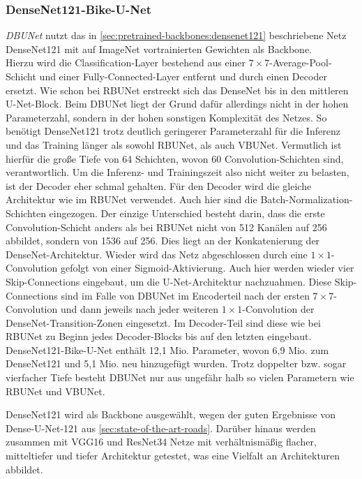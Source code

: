 \subsubsection{DenseNet121-Bike-U-Net}

\textit{\ac{DBUNet}} nutzt das in \autoref{sec:pretrained-backbones:densenet121} beschriebene Netz DenseNet121 
mit auf ImageNet vortrainierten Gewichten als Backbone. \\
Hierzu wird die Classification-Layer bestehend aus einer $7\times 7$-Average-Pool-Schicht 
und einer Fully-Connected-Layer entfernt und durch einen Decoder ersetzt. 
Wie schon bei \ac{RBUNet} erstreckt sich das DenseNet bis in den mittleren U-Net-Block. Beim \ac{DBUNet} 
liegt der Grund dafür allerdings nicht in der hohen Parameterzahl, sondern in der hohen sonstigen Komplexität 
des Netzes. So benötigt DenseNet121 trotz deutlich geringerer Parameterzahl für die Inferenz und das Training länger 
als sowohl \ac{RBUNet}, als auch \ac{VBUNet}. Vermutlich ist hierfür die große Tiefe von 64 Schichten, wovon 
60 Convolution-Schichten sind, verantwortlich. Um die Inferenz- und Trainingszeit also nicht weiter zu belasten, 
ist der Decoder eher schmal gehalten. Für den Decoder wird die gleiche Architektur wie im \ac{RBUNet} verwendet.
Auch hier sind die Batch-Normalization-Schichten eingezogen. Der einzige Unterschied besteht darin, 
dass die erste Convolution-Schicht anders als bei \ac{RBUNet} nicht von 512 Kanälen auf 256 abbildet, 
sondern von 1536 auf 256. Dies liegt an der Konkatenierung der DenseNet-Architektur. Wieder wird das 
Netz abgeschlossen durch eine $1\times 1$-Convolution gefolgt von einer Sigmoid-Aktivierung. 
Auch hier werden wieder vier Skip-Connections eingebaut, um die U-Net-Architektur nachzuahmen. 
Diese Skip-Connections sind im Falle von \ac{DBUNet} im Encoderteil nach der ersten $7 \times 7$-Convolution 
und dann jeweils nach jeder weiteren $1\times 1$-Convolution der DenseNet-Transition-Zonen eingesetzt. 
Im Decoder-Teil sind diese wie bei \ac{RBUNet} zu Beginn jedes Decoder-Blocks bis auf den letzten eingebaut. \\
DenseNet121-Bike-U-Net enthält 12,1 Mio. Parameter, wovon 6,9 Mio. zum DenseNet121 und 5,1 Mio. neu hinzugefügt 
wurden. Trotz doppelter bzw. sogar vierfacher Tiefe besteht \ac{DBUNet} nur aus ungefähr halb so vielen 
Parametern wie \ac{RBUNet} und \ac{VBUNet}. 

DenseNet121 wird als Backbone ausgewählt, wegen der guten Ergebnisse von Dense-U-Net-121 aus \autoref{sec:state-of-the-art-roads}. 
Darüber hinaus werden zusammen mit VGG16 und ResNet34 Netze mit verhältnismäßig flacher, mitteltiefer und tiefer 
Architektur getestet, was eine Vielfalt an Architekturen abbildet.

